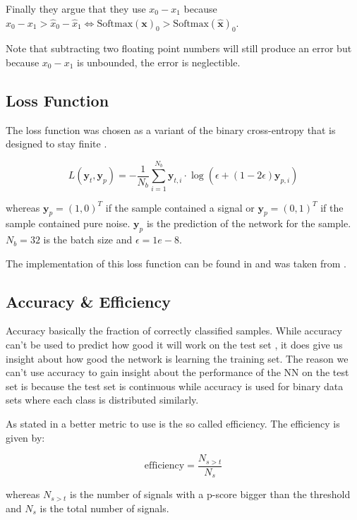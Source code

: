 Finally they \cite{PhysRevD.105.043002} argue that they use $x_0 - x_1$ because
$x_0 - x_1 > \hat{x}_0 - \hat{x}_1 \Leftrightarrow \text{Softmax}(\mathbf{x})_0
> \text{Softmax}(\mathbf{\hat{x}})_0$.

Note that subtracting two floating point numbers will still produce an error but
because $x_0 - x_1$ is unbounded, the error is neglectible.


\subsection{Loss Function}
The loss function was chosen as a variant of the binary cross-entropy that is
designed to stay finite \cite{PhysRevD.105.043002}. 

\begin{equation}
  L(\mathbf{y}_t, \mathbf{y}_p) = -\frac{1}{N_b} \sum_{i=1}^{N_b}
  \mathbf{y}_{t,i} \cdot \log(\epsilon + (1 - 2\epsilon) \mathbf{y}_{p,i})
\end{equation}

whereas $\mathbf{y}_p = (1, 0)^T$ if the sample contained a signal or
$\mathbf{y}_p = (0, 1)^T$ if the sample contained pure noise. $\mathbf{y}_p$ is
the prediction of the network for the sample. $N_b = 32$ is the batch size and
$\epsilon = 1e-8$.

The implementation of this loss function can be found in
 and was taken from \cite{MLGWSC1} .

\subsection{Accuracy \& Efficiency}
Accuracy  basically the fraction of correctly classified samples. While
accuracy can't be used to predict how good it will work on the test set
\cite{PhysRevD.100.063015}, it does
give us insight about how good the network is learning the training set. The
reason we can't use accuracy to gain insight about the performance of the NN
on the test set is because the test set is continuous while accuracy is used
for binary data sets where each class is distributed similarly.

As stated in \cite{PhysRevD.105.043002} a better metric to use is the so called
efficiency. The efficiency is given by:

\begin{equation}
  \text{efficiency} = \frac{N_{s>t}}{N_s}
\end{equation}

whereas $N_{s>t}$ is the number of signals with a p-score bigger than the
threshold and $N_s$ is the total number of signals.

